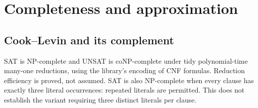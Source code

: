 \section{Completeness and approximation}

\begin{result}
\subsection{Cook--Levin and its complement}
SAT is NP-complete and UNSAT is coNP-complete under tidy polynomial-time
many-one reductions, using the library's encoding  of CNF formulas.
Reduction efficiency is proved, not assumed. SAT is also NP-complete
when every clause has exactly three literal occurrences:
repeated literals are permitted. This does not establish the variant requiring
three distinct literals per clause.\citep[Section 2.3]{AroraBarak09}
\end{result}

